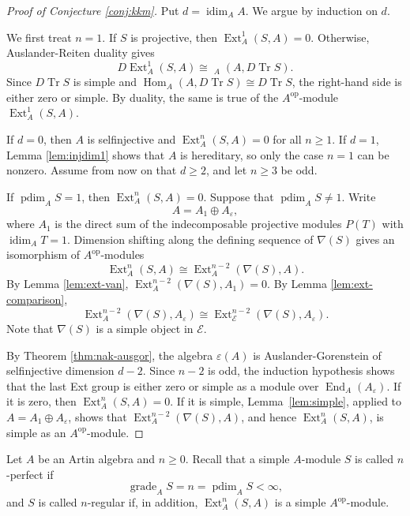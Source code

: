 \documentclass[a4paper,reqno]{amsart}
\numberwithin{equation}{section}
\theoremstyle{plain}
\theoremstyle{definition}
\theoremstyle{remark}
\DeclareMathOperator{\Hom}{Hom}
\DeclareMathOperator{\Ext}{Ext}
\DeclareMathOperator{\End}{End}
\DeclareMathOperator{\oHom}{\overline{Hom}}
\DeclareMathOperator{\grade}{grade}
\DeclareMathOperator{\pdim}{pdim}
\DeclareMathOperator{\idim}{idim}
\DeclareMathOperator{\op}{op}
\DeclareMathOperator{\Tr}{Tr}
\renewcommand{\-}{\mbox{-}}
\newcommand{\scE}{\mathcal{E}}
\begin{document}
\begin{proof}[Proof of Conjecture \ref{conj:kkm}]
Put \(d=\idim_AA\).  We argue by induction on \(d\).

We first treat \(n=1\).  If \(S\) is projective, then
\(\Ext_A^1(S,A)=0\).  Otherwise, Auslander-Reiten duality gives
\[
  D\Ext_A^1(S,A)\cong \oHom_A(A,D\Tr S).
\]
Since \(D\Tr S\) is simple and
\(\Hom_A(A,D\Tr  S)\cong D\Tr S\), the right-hand side is either zero or
simple.  By duality, the same is true of the \(A^{\op}\)-module
\(\Ext_A^1(S,A)\).

If \(d=0\), then \(A\) is selfinjective and
\(\Ext_A^n(S,A)=0\) for all \(n\geq1\).  If \(d=1\), Lemma
\ref{lem:injdim1} shows that \(A\) is hereditary, so only the case \(n=1\)
can be nonzero.  
Assume from now on that \(d\geq2\), and let \(n\geq3\) be odd.

If  \(\pdim_AS=1\), then \(\Ext_A^n(S,A)=0\).  
Suppose that \(\pdim_AS\neq 1\).  
Write
\[
  A=A_1\oplus A_\varepsilon,
\]
where \(A_1\) is the direct sum of the indecomposable projective modules \(P(T)\)
with \(\idim_AT=1\).  Dimension shifting along the defining sequence of
\(\nabla(S)\) gives an isomorphism of  \(A^{\op}\)-modules
\[
  \Ext_A^n(S,A)\cong\Ext_A^{n-2}(\nabla(S),A).
\]
By Lemma \ref{lem:ext-van},
\(\Ext_A^{n-2}(\nabla(S),A_1)=0\).  
By Lemma  \ref{lem:ext-comparison},
\[
  \Ext_A^{n-2}(\nabla(S),A_\varepsilon)
  \cong
  \Ext_\scE^{n-2}(\nabla(S),A_\varepsilon).
\]
Note that \(\nabla(S)\) is a simple object in \(\scE\).

By Theorem \ref{thm:nak-ausgor}, the algebra
\(\varepsilon(A)\) is Auslander-Gorenstein of selfinjective dimension \(d-2\).  
Since \(n-2\) is odd, the induction hypothesis shows that the last
Ext group is either zero or simple as a module over
\(\End_A(A_\varepsilon)\).  
If it is zero, then \(\Ext_A^n(S,A)=0\).  If it
is simple, Lemma~\ref{lem:simple}, applied to
\(A=A_1\oplus A_\varepsilon\), shows that
\(\Ext_A^{n-2}(\nabla(S),A)\), and hence \(\Ext_A^n(S,A)\), 
is simple as an \(A^{\op}\)-module.
\end{proof}

Let \(A\) be an Artin algebra and \(n\geq 0\).
Recall that a simple \(A\)-module \(S\) is called {\(n\)-perfect} if 
\begin{equation*}
    \grade_AS=n=\pdim_AS<\infty,
\end{equation*}
and \(S\) is called  {\(n\)-regular} if, 
in addition, $\Ext^n_A(S,A)$ is a simple \(A^{\op}\)-module.
\end{document}
